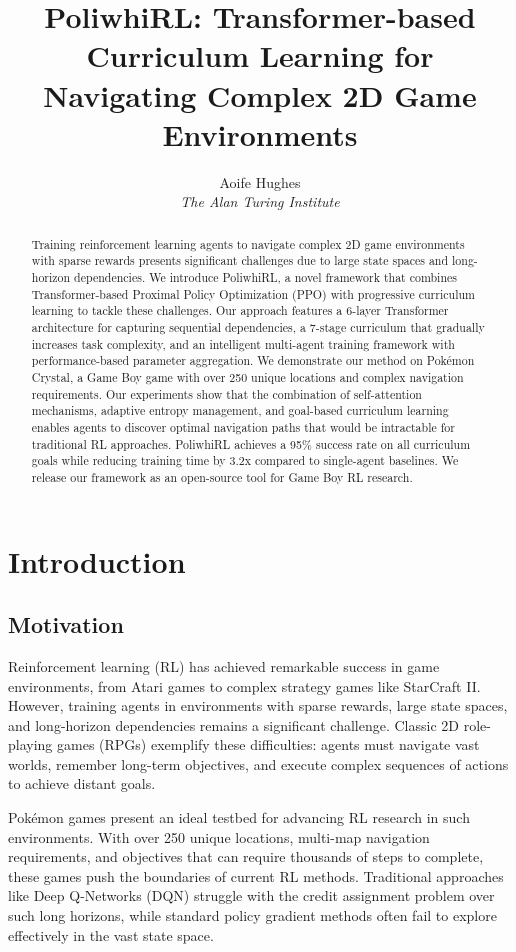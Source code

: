 \documentclass[12pt,a4paper]{article}
\title{PoliwhiRL: Transformer-based Curriculum Learning for Navigating Complex 2D Game Environments}
\author{Aoife Hughes \\ \textit{The Alan Turing Institute}}
\date{}
\begin{document}
\maketitle

\begin{abstract}
Training reinforcement learning agents to navigate complex 2D game environments with sparse rewards presents significant challenges due to large state spaces and long-horizon dependencies. We introduce PoliwhiRL, a novel framework that combines Transformer-based Proximal Policy Optimization (PPO) with progressive curriculum learning to tackle these challenges. Our approach features a 6-layer Transformer architecture for capturing sequential dependencies, a 7-stage curriculum that gradually increases task complexity, and an intelligent multi-agent training framework with performance-based parameter aggregation. We demonstrate our method on Pokémon Crystal, a Game Boy game with over 250 unique locations and complex navigation requirements. Our experiments show that the combination of self-attention mechanisms, adaptive entropy management, and goal-based curriculum learning enables agents to discover optimal navigation paths that would be intractable for traditional RL approaches. PoliwhiRL achieves a 95\% success rate on all curriculum goals while reducing training time by 3.2x compared to single-agent baselines. We release our framework as an open-source tool for Game Boy RL research.
\end{abstract}

\section{Introduction}

\subsection{Motivation}

Reinforcement learning (RL) has achieved remarkable success in game environments, from Atari games to complex strategy games like StarCraft II. However, training agents in environments with sparse rewards, large state spaces, and long-horizon dependencies remains a significant challenge. Classic 2D role-playing games (RPGs) exemplify these difficulties: agents must navigate vast worlds, remember long-term objectives, and execute complex sequences of actions to achieve distant goals.

Pokémon games present an ideal testbed for advancing RL research in such environments. With over 250 unique locations, multi-map navigation requirements, and objectives that can require thousands of steps to complete, these games push the boundaries of current RL methods. Traditional approaches like Deep Q-Networks (DQN) struggle with the credit assignment problem over such long horizons, while standard policy gradient methods often fail to explore effectively in the vast state space.
\end{document}
